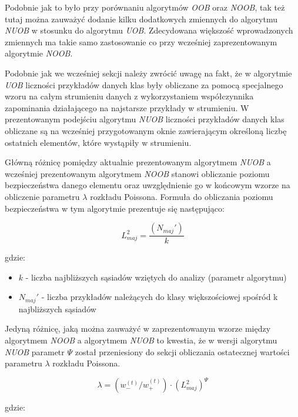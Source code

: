\noindent Podobnie jak to było przy porównaniu algorytmów \textit{OOB} oraz \textit{NOOB}, tak też tutaj można zauważyć dodanie kilku dodatkowych zmiennych do algorytmu \textit{NUOB} w stosunku do algorytmu \textit{UOB}. Zdecydowana większość wprowadzonych zmiennych ma takie samo zastosowanie co przy wcześniej zaprezentowanym algorytmie \textit{NOOB}.

Podobnie jak we wcześniej sekcji należy zwrócić uwagę na fakt, że w algorytmie \textit{UOB} liczności przykładów danych klas były obliczane za pomocą specjalnego wzoru na całym strumieniu danych z wykorzystaniem współczynnika zapominania działającego na najstarsze przykłady w strumieniu. W prezentowanym podejściu algorytmu \textit{NUOB} liczności przykładów danych klas obliczane są na wcześniej przygotowanym oknie zawierającym określoną liczbę ostatnich elementów, które wystąpiły w strumieniu.

Główną różnicę pomiędzy aktualnie prezentowanym algorytmem \textit{NUOB} a wcześniej prezentowanym algorytmem \textit{NOOB} stanowi obliczanie poziomu bezpieczeństwa danego elementu oraz uwzględnienie go w końcowym wzorze na obliczenie parametru $\lambda$ rozkładu Poissona. Formuła do obliczania poziomu bezpieczeństwa w tym algorytmie prezentuje się następująco:

\begin{equation}
    L^2_{maj} = \frac{(N_{maj}')}{k}
\end{equation}

\noindent gdzie:

\begin{itemize}
    \item $k$ - liczba najbliższych sąsiadów wziętych do analizy (parametr algorytmu)
    \item $N_{maj}'$ - liczba przykładów należących do klasy większościowej spośród k najbliższych sąsiadów
\end{itemize}

\noindent Jedyną różnicę, jaką można zauważyć w zaprezentowanym wzorze między algorytmem \textit{NOOB} a algorytmem \textit{NUOB} to kwestia, że w wersji algorytmu \textit{NUOB} parametr $\Psi$ został przeniesiony do sekcji obliczania ostatecznej wartości parametru $\lambda$ rozkładu Poissona.

\begin{equation}
    \lambda = (w^{(t)}_{-}/w^{(t)}_{+}) \cdot (L^2_{maj})^{\Psi}
\end{equation}

\noindent gdzie:

